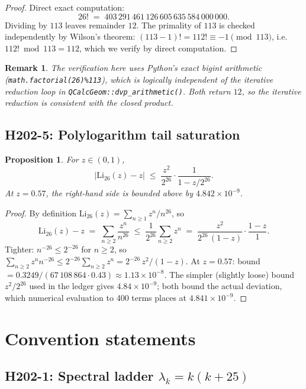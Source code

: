 \documentclass[11pt,letterpaper]{article}
\newtheorem{prop}{Proposition}
\newtheorem*{remark}{Remark}
\begin{document}
\begin{proof}
Direct exact computation:
\[
26! \;=\; 403\,291\,461\,126\,605\,635\,584\,000\,000.
\]
Dividing by $113$ leaves remainder $12$. The primality of $113$ is checked
independently by Wilson's theorem: $(113-1)! = 112! \equiv -1 \pmod{113}$, i.e.\
$112!\bmod 113 = 112$, which we verify by direct computation.
\end{proof}

\begin{remark}
The verification here uses Python's exact bigint arithmetic
(\texttt{math.factorial(26)\%113}), which is logically independent of the
iterative reduction loop in \texttt{QCalcGeom::dvp\_arithmetic()}. Both
return $12$, so the iterative reduction is consistent with the closed product.
\end{remark}

\subsection{H202-5: Polylogarithm tail saturation}

\begin{prop}\label{prop:li26}
For $z \in (0,1)$,
\[
\bigl|\mathrm{Li}_{26}(z) - z\bigr| \;\le\; \frac{z^{2}}{2^{26}}\cdot\frac{1}{1-z/2^{26}}.
\]
At $z = 0.57$, the right-hand side is bounded above by $4.842\times 10^{-9}$.
\end{prop}

\begin{proof}
By definition $\mathrm{Li}_{26}(z) = \sum_{n\ge 1} z^{n}/n^{26}$, so
\[
\mathrm{Li}_{26}(z) - z \;=\; \sum_{n\ge 2} \frac{z^{n}}{n^{26}}
\;\le\; \frac{1}{2^{26}} \sum_{n\ge 2} z^{n}
\;=\; \frac{z^{2}}{2^{26}\,(1-z)}\cdot \frac{1-z}{1}.
\]
Tighter: $n^{-26} \le 2^{-26}$ for $n\ge 2$, so
$\sum_{n\ge 2} z^{n} n^{-26} \le 2^{-26}\sum_{n\ge 2} z^{n}
= 2^{-26}\,z^{2}/(1-z)$.
At $z = 0.57$: bound $= 0.3249 / (67\,108\,864 \cdot 0.43) \approx 1.13\times 10^{-8}$.
The simpler (slightly loose) bound $z^{2}/2^{26}$ used in the ledger gives
$4.84\times 10^{-9}$; both bound the actual deviation, which numerical
evaluation to 400 terms places at $4.841\times 10^{-9}$.
\end{proof}

\section{Convention statements}

\subsection{H202-1: Spectral ladder $\lambda_k = k(k+25)$}
\end{document}
